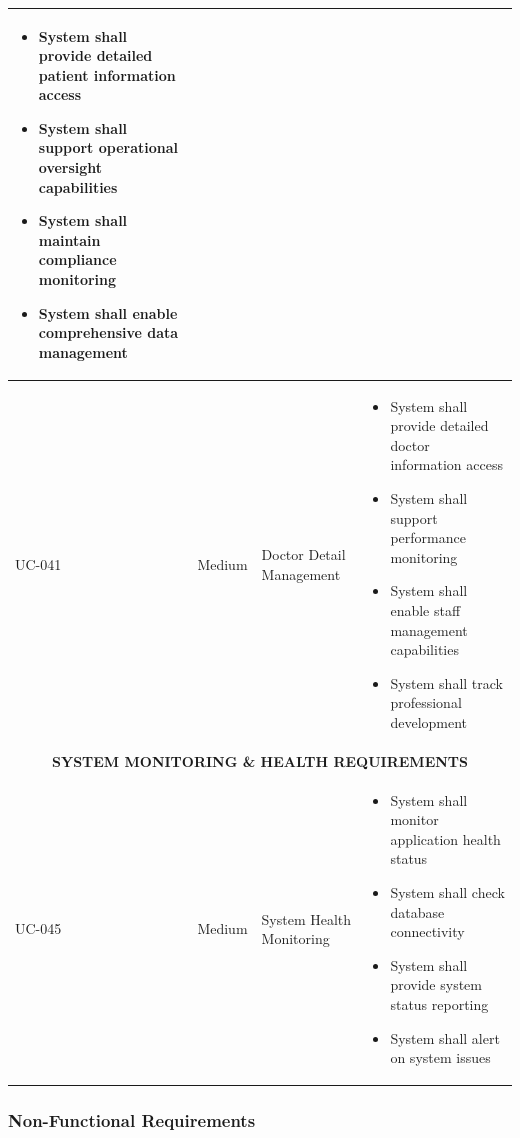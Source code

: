 \documentclass[12pt,a4paper]{article}
\begin{document}
\begin{longtable}{|p{1.2cm}|p{2.5cm}|p{3.5cm}|p{6.8cm}|}
\begin{itemize}[leftmargin=*,topsep=1pt,partopsep=0pt,parsep=0pt,itemsep=1pt]
\item System shall provide detailed patient information access
\item System shall support operational oversight capabilities
\item System shall maintain compliance monitoring
\item System shall enable comprehensive data management
\end{itemize} \\
\hline
UC-041 & Medium & Doctor Detail Management & 
\begin{itemize}[leftmargin=*,topsep=1pt,partopsep=0pt,parsep=0pt,itemsep=1pt]
\item System shall provide detailed doctor information access
\item System shall support performance monitoring
\item System shall enable staff management capabilities
\item System shall track professional development
\end{itemize} \\
\hline
\multicolumn{4}{|c|}{\textbf{SYSTEM MONITORING \& HEALTH REQUIREMENTS}} \\
\hline
UC-045 & Medium & System Health Monitoring & 
\begin{itemize}[leftmargin=*,topsep=1pt,partopsep=0pt,parsep=0pt,itemsep=1pt]
\item System shall monitor application health status
\item System shall check database connectivity
\item System shall provide system status reporting
\item System shall alert on system issues
\end{itemize} \\
\hline
\end{longtable}

\subsubsection{Non-Functional Requirements}
\end{document}
